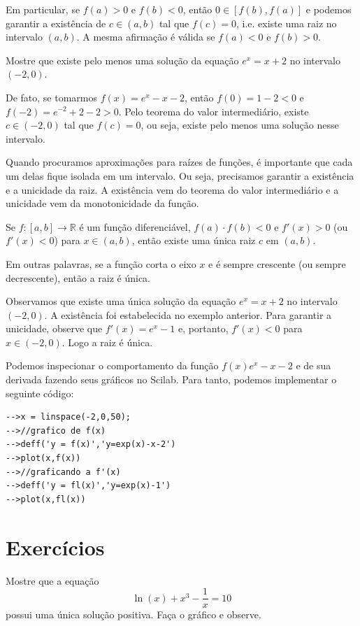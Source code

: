 Em particular, se $f(a)>0$ e $f(b)<0$, então $0\in [f(b),f(a)]$ e podemos garantir a existência de $c\in(a,b)$ tal que $f(c)=0$, i.e. existe uma raiz no intervalo $(a,b)$. A mesma afirmação é válida se $f(a)<0$ e $f(b)>0$.
\begin{ex}
Mostre que existe pelo menos uma solução da equação $e^x=x+2$ no intervalo $(-2,0)$.

De fato, se tomarmos $f(x)=e^x-x-2$, então $f(0)=1-2<0$ e $f(-2)=e^{-2}+2-2>0$. Pelo teorema do valor intermediário, existe $c\in(-2,0)$ tal que $f(c)=0$, ou seja, existe pelo menos uma solução nesse intervalo.
\end{ex}

Quando procuramos aproximações para raízes de funções, é importante que cada um delas fique isolada em um intervalo. Ou seja, precisamos garantir a existência e a unicidade da raiz. A existência vem do teorema do valor intermediário e a unicidade vem da monotonicidade da função.
\begin{teo}
Se $f:[a,b]\to\mathbb{R}$ é um função diferenciável, $f(a)\cdot f(b)<0$ e $f'(x)>0$ (ou $f'(x)<0$) para $x\in(a,b)$, então existe uma única raiz $c$ em $(a,b)$.
\end{teo}

Em outras palavras, se a função corta o eixo $x$ e é sempre crescente (ou sempre decrescente), então a raiz é única.
\begin{ex}
Observamos que existe uma única solução da equação $e^x=x+2$ no intervalo $(-2,0)$. A existência foi estabelecida no exemplo anterior. Para garantir a unicidade, observe que $f'(x)=e^x-1$ e, portanto, $f'(x)<0$ para $x\in(-2,0)$. Logo a raiz é única.

\ifisscilab
Podemos inspecionar o comportamento da função $f(x) e^x - x - 2$ e de sua derivada fazendo seus gráficos no Scilab. Para tanto, podemos implementar o seguinte código:
\begin{verbatim}
-->x = linspace(-2,0,50);
-->//grafico de f(x)
-->deff('y = f(x)','y=exp(x)-x-2')
-->plot(x,f(x))
-->//graficando a f'(x)
-->deff('y = fl(x)','y=exp(x)-1')
-->plot(x,fl(x))
\end{verbatim}
\fi
\end{ex}

\section*{Exercícios}

\begin{Exercise}Mostre que a equação
  \begin{equation*}
    \ln(x)+x^3-\frac{1}{x}=10  
  \end{equation*}
possui uma única solução positiva. Faça o gráfico e observe.
\end{Exercise}

